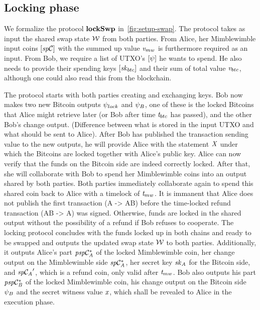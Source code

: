 \subsection{Locking phase}\label{subsec:atom:locking}

We formalize the protocol $\mathbf{lockSwp}$ in~\cref{fig:setup-swap}.
The protocol takes as input the shared swap state $\mathcal{W}$ from both parties.
From Alice, her Mimblewimble input coins $[\mathit{sp}\mathcal{C}]$ with the summed up value $\mathit{v}_{mw}$ is furthermore required as an input.
From Bob, we require a list of UTXO's $[\psi]$ he wants to spend.
He also needs to provide their spending keys $[\mathit{sk}_{btc}]$ and their sum of total value $\mathit{v}_{btc}$, although one could also read this from the blockchain.

The protocol starts with both parties creating and exchanging keys.
Bob now makes two new Bitcoin outputs $\psi_{lock}$ and $\psi_{B}$, one of these is the locked Bitcoins that Alice might retrieve later (or Bob after time $\mathit{t}_{btc}$ has passed), and the other Bob's change output. (Difference between what is stored in the input UTXO and what should be sent to Alice).
After Bob has published the transaction sending value to the new outputs, he will provide Alice with the statement $\mathit{X}$ under which the Bitcoins are locked together with Alice's public key.
Alice can now verify that the funds on the Bitcoin side are indeed correctly locked.
After that, she will collaborate with Bob to spend her Mimblewimble coins into an output shared by both parties.
Both parties immediately collaborate again to spend this shared coin back to Alice with a timelock of $\mathit{t}_{mw}$.
It is immanent that Alice does not publish the first transaction (A -> AB) before the time-locked refund transaction (AB -> A) was signed.
Otherwise, funds are locked in the shared output without the possibility of a refund if Bob refuses to cooperate.
The locking protocol concludes with the funds locked up in both chains and ready to be swapped and outputs the updated swap state $\mathcal{W}$ to both parties.
Additionally, it outputs Alice's part $\mathit{psp}\mathcal{C}_{\mathit{A}}^*$ of the locked Mimblewimble coin, her change output on the Mimblewimble side $\mathit{sp}\mathcal{C}_{\mathit{A}}^*$, her secret key $\mathit{sk}_{\mathit{A}}$ for the Bitcoin side, and ${\mathit{sp}\mathcal{C}_{\mathit{A}}}'$, which is a refund coin, only valid after $\mathit{t}_{mw}$.
Bob also outputs his part $\mathit{psp}\mathcal{C}_{\mathit{B}}^*$ of the locked Mimblewimble coin, his change output on the Bitcoin side $\psi_{B}$ and the secret witness value $\mathit{x}$, which shall be revealed to Alice in the execution phase.

